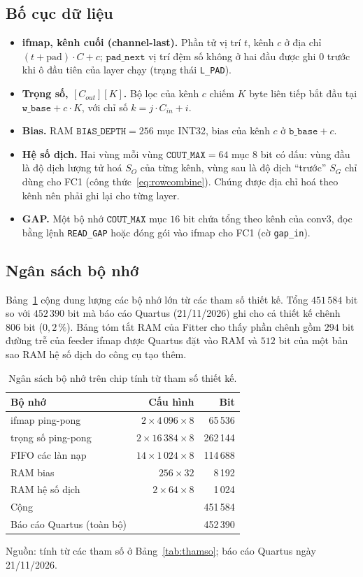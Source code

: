 \subsection{Bố cục dữ liệu}
\begin{itemize}
  \item \textbf{ifmap, kênh cuối (channel-last).} Phần tử vị trí $t$, kênh $c$ ở địa chỉ $(t+\mathrm{pad})\cdot C+c$; $\texttt{pad\_next}$ vị trí đệm số không ở hai đầu được ghi $0$ trước khi ô đầu tiên của layer chạy (trạng thái \texttt{L\_PAD}).
  \item \textbf{Trọng số, $[C_{out}][K]$.} Bộ lọc của kênh $c$ chiếm $K$ byte liên tiếp bắt đầu tại $\texttt{w\_base}+c\cdot K$, với chỉ số $k=j\cdot C_{in}+i$.
  \item \textbf{Bias.} RAM $\texttt{BIAS\_DEPTH}=256$ mục INT32, bias của kênh $c$ ở $\texttt{b\_base}+c$.
  \item \textbf{Hệ số dịch.} Hai vùng mỗi vùng $\texttt{COUT\_MAX}=64$ mục $8$ bit có dấu: vùng đầu là độ dịch lượng tử hoá $S_O$ của từng kênh, vùng sau là độ dịch ``trước'' $S_G$ chỉ dùng cho FC1 (công thức~\eqref{eq:rowcombine}).
  Chúng được địa chỉ hoá theo kênh nên phải ghi lại cho từng layer.
  \item \textbf{GAP.} Một bộ nhớ $\texttt{COUT\_MAX}$ mục $16$ bit chứa tổng theo kênh của conv3, đọc bằng lệnh \texttt{READ\_GAP} hoặc đóng gói vào ifmap cho FC1 (cờ \texttt{gap\_in}).
\end{itemize}

\subsection{Ngân sách bộ nhớ}
Bảng~\ref{tab:bonho} cộng dung lượng các bộ nhớ lớn từ các tham số thiết kế.
Tổng $451\,584$ bit so với $452\,390$ bit mà báo cáo Quartus (21/11/2026) ghi cho cả thiết kế chênh $806$ bit ($0{,}2\,\%$).
Bảng tóm tắt RAM của Fitter cho thấy phần chênh gồm $294$ bit đường trễ của feeder ifmap được Quartus đặt vào RAM và $512$ bit của một bản sao RAM hệ số dịch do công cụ tạo thêm.

\begin{table}[htbp]\centering
\caption{Ngân sách bộ nhớ trên chip tính từ tham số thiết kế.}\label{tab:bonho}
\small
\begin{tabular}{@{}lrr@{}}
\toprule
Bộ nhớ & Cấu hình & Bit \\ \midrule
ifmap ping-pong & $2\times4\,096\times8$ & 65\,536 \\
trọng số ping-pong & $2\times16\,384\times8$ & 262\,144 \\
FIFO các làn nạp & $14\times1\,024\times8$ & 114\,688 \\
RAM bias & $256\times32$ & 8\,192 \\
RAM hệ số dịch & $2\times64\times8$ & 1\,024 \\ \midrule
Cộng & & 451\,584 \\
Báo cáo Quartus (toàn bộ) & & 452\,390 \\ \bottomrule
\end{tabular}

\smallskip
\footnotesize Nguồn: tính từ các tham số ở Bảng~\ref{tab:thamso}; báo cáo Quartus ngày 21/11/2026.
\end{table}

